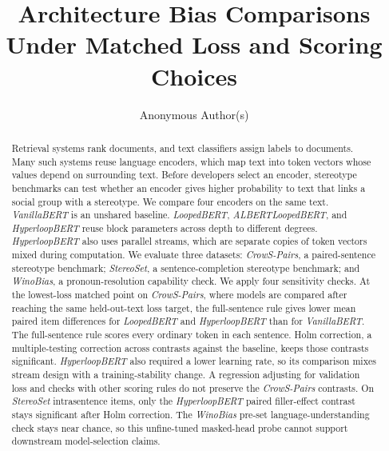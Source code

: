 \documentclass[sigconf,natbib=true,anonymous=true]{acmart}
\begin{document}
\title{Architecture Bias Comparisons Under Matched Loss and Scoring Choices}

\author{Anonymous Author(s)}

\begin{abstract}
Retrieval systems rank documents, and text classifiers assign labels to documents. Many such systems reuse language encoders, which map text into token vectors whose values depend on surrounding text. Before developers select an encoder, stereotype benchmarks can test whether an encoder gives higher probability to text that links a social group with a stereotype. We compare four encoders on the same text. \emph{VanillaBERT} is an unshared baseline. \emph{LoopedBERT}, \emph{ALBERTLoopedBERT}, and \emph{HyperloopBERT} reuse block parameters across depth to different degrees. \emph{HyperloopBERT} also uses parallel streams, which are separate copies of token vectors mixed during computation. We evaluate three datasets: \emph{CrowS-Pairs}, a paired-sentence stereotype benchmark; \emph{StereoSet}, a sentence-completion stereotype benchmark; and \emph{WinoBias}, a pronoun-resolution capability check. We apply four sensitivity checks. At the lowest-loss matched point on \emph{CrowS-Pairs}, where models are compared after reaching the same held-out-text loss target, the full-sentence rule gives lower mean paired item differences for \emph{LoopedBERT} and \emph{HyperloopBERT} than for \emph{VanillaBERT}. The full-sentence rule scores every ordinary token in each sentence. Holm correction, a multiple-testing correction across contrasts against the baseline, keeps those contrasts significant. \emph{HyperloopBERT} also required a lower learning rate, so its comparison mixes stream design with a training-stability change. A regression adjusting for validation loss and checks with other scoring rules do not preserve the \emph{CrowS-Pairs} contrasts. On \emph{StereoSet} intrasentence items, only the \emph{HyperloopBERT} paired filler-effect contrast stays significant after Holm correction. The \emph{WinoBias} pre-set language-understanding check stays near chance, so this unfine-tuned masked-head probe cannot support downstream model-selection claims.
\end{abstract}


\maketitle
\end{document}
